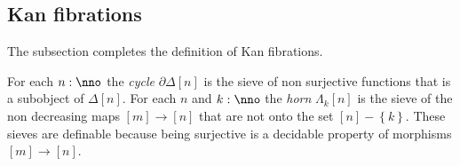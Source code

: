 \documentclass{tac}
\newcommand\hide[1]{}
\newcommand\set[1]{\left\{#1\right\}}
\newcommand\of{:}
\newcommand\simplex\Delta
\newcommand\cycle{\partial\Delta}
\newcommand\horn\Lambda
\begin{document}
\hide{ Here the definition of 'anodyne' used to go. May need a substitute. }

\subsection{Kan fibrations}
\hide{ significant rewriting will be needed here to avoid anodynes }
The subsection completes the definition of Kan fibrations.

\hide{ Add def. of sieve over $\simCat$ }
\begin{definition} For each $n\of \nno$ the \emph{cycle} $\cycle[n]$ is the sieve of non surjective functions that is a subobject of $\simplex[n]$. For each $n$ and $k\of\nno$ the \emph{horn} $\horn_k[n]$ is the sieve of the non decreasing maps $[m]\to [n]$ that are not onto the set $[n]-\set{k}$. These sieves are definable because being surjective is a decidable property of morphisms $[m]\to[n]$. 
\end{definition}
\end{document}
